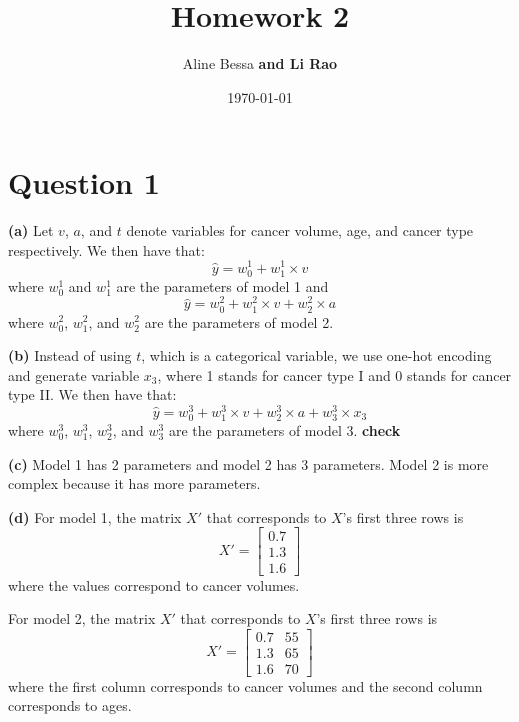 \documentclass[leqno]{article}
\title{Homework 2}
\author{Aline Bessa \textbf{and Li Rao}}
\date\today
\begin{document}
\maketitle %

\section*{Question 1}

\textbf{(a)} Let $v$, $a$, and $t$ denote variables for cancer volume, age, and cancer type respectively. We then have that:
\begin{equation*}
\hat{y} = w^1_0 + w^1_1 \times v
\end{equation*}
where $w^1_0$ and $w^1_1$ are the parameters of model 1 and
\begin{equation*}
\hat{y} = w^2_0 + w^2_1 \times v + w^2_2 \times a
\end{equation*}
where $w^2_0$, $w^2_1$, and $w^2_2$ are the parameters of model 2.

\hfill

\textbf{(b)} Instead of using $t$, which is a categorical variable, we use one-hot encoding and generate variable $x_3$, where 1 stands for cancer type I and 
0 stands for cancer type II. We then have that:
\begin{equation*}
\hat{y} = w^3_0 + w^3_1 \times v + w^3_2 \times a + w^3_3 \times x_3
\end{equation*}
where $w^3_0$, $w^3_1$, $w^3_2$, and $w^3_3$ are the parameters of model 3. \textbf{check}

\hfill

\textbf{(c)} Model 1 has 2 parameters and model 2 has 3 parameters. Model 2 is more complex because it has more parameters.

\hfill

\textbf{(d)} For model 1, the matrix $X'$ that corresponds to $X$'s first three rows is
\[
X'=
  \begin{bmatrix}
    0.7 \\
    1.3 \\
    1.6
  \end{bmatrix}
\]
where the values correspond to cancer volumes.

For model 2, the matrix $X'$ that corresponds to $X$'s first three rows is
\[
X'=
  \begin{bmatrix}
    0.7 & 55 \\
    1.3 & 65 \\
    1.6 & 70
  \end{bmatrix}
\]
where the first column corresponds to cancer volumes and the second column corresponds to ages.
\end{document}
